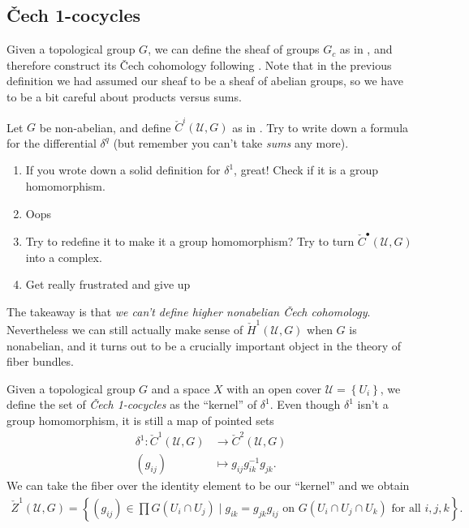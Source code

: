 \documentclass[11pt]{book}
\begin{document}
\subsection{\v{C}ech 1-cocycles}

Given a topological group $G$, we can define the sheaf of groups $G_c$ as in , 
and therefore construct its \v{C}ech cohomology following . Note that in the previous definition we had assumed our sheaf to be a sheaf of abelian groups, so we have to be a bit careful about products versus sums.

\begin{exercise}[Suggested] Let $G$ be non-abelian, and define $\check{C}^i(\mathcal{U},G)$ as in . Try to write down a formula for the differential $\delta^q$ (but remember you can't take \emph{sums} any more).
\begin{enumerate}
    \item If you wrote down a solid definition for $\delta^1$, great! Check if it is a group homomorphism.
    \item Oops
    \item Try to redefine it to make it a group homomorphism? Try to turn $\check{C}^\bullet(\mathcal{U},G)$ into a complex.
    \item Get really frustrated and give up
\end{enumerate}
\end{exercise}

The takeaway is that \emph{we can't define higher nonabelian \v{C}ech cohomology}. Nevertheless we can still actually make sense of $\check{H}^1(\mathcal{U},G)$ when $G$ is nonabelian, and it turns out to be a crucially important object in the theory of fiber bundles.

\begin{definition}\label{def:equivalence-of-1-cocycles} 
Given a topological group $G$ and a space $X$ with an open cover $\mathcal{U} = \left\{ U_i \right\}$, we define the set of \emph{\v{C}ech 1-cocycles} as the ``kernel'' of $\delta^1$. Even though $\delta^1$ isn't a group homomorphism, it is still a map of pointed sets
\begin{align*}
    \delta^1 \colon \check{C}^1(\mathcal{U},G) &\to \check{C}^2(\mathcal{U},G) \\
    (g_{ij}) &\mapsto g_{ij}g_{ik}^{-1} g_{jk}.
\end{align*}
We can take the fiber over the identity element to be our ``kernel'' and we obtain
\begin{align*}
    \check{Z}^1(\mathcal{U},G) = \left\{ (g_{ij}) \in \prod G(U_i \cap U_j) \mid g_{ik} = g_{jk} g_{ij} \text{ on } G(U_i \cap U_j\cap U_k) \text{ for all }i,j,k \right\}.
\end{align*}
\end{definition}
\end{document}

